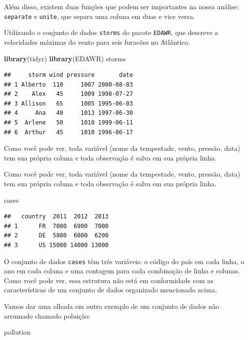 \documentclass[]{book}
\newenvironment{Shaded}{\begin{snugshade}}{\end{snugshade}}
\newcommand{\KeywordTok}[1]{\textcolor[rgb]{0.13,0.29,0.53}{\textbf{#1}}}
\newcommand{\NormalTok}[1]{#1}
\begin{document}
Além disso, existem duas funções que podem ser importantes na nossa análise: \texttt{separate} e \texttt{unite}, que separa uma coluna em duas e vice versa.

Utilizando o conjunto de dados \texttt{storms} do pacote \texttt{EDAWR}, que descreve a velocidades máximas do vento para seis furacões no Atlântico.

\begin{Shaded}
\begin{Highlighting}[]
\KeywordTok{library}\NormalTok{(tidyr)}
\KeywordTok{library}\NormalTok{(EDAWR)}
\NormalTok{storms}
\end{Highlighting}
\end{Shaded}

\begin{verbatim}
##     storm wind pressure       date
## 1 Alberto  110     1007 2000-08-03
## 2    Alex   45     1009 1998-07-27
## 3 Allison   65     1005 1995-06-03
## 4     Ana   40     1013 1997-06-30
## 5  Arlene   50     1010 1999-06-11
## 6  Arthur   45     1010 1996-06-17
\end{verbatim}

Como você pode ver, toda variável (nome da tempestade, vento, pressão, data) tem sua própria coluna e toda observação é salva em sua própria linha.

Como você pode ver, toda variável (nome da tempestade, vento, pressão, data) tem sua própria coluna e toda observação é salva em sua própria linha.

\begin{Shaded}
\begin{Highlighting}[]
\NormalTok{cases}
\end{Highlighting}
\end{Shaded}

\begin{verbatim}
##   country  2011  2012  2013
## 1      FR  7000  6900  7000
## 2      DE  5800  6000  6200
## 3      US 15000 14000 13000
\end{verbatim}

O conjunto de dados \texttt{cases} têm três variáveis: o código do país em cada linha, o ano em cada coluna e uma contagem para cada combinação de linha e colunas. Como você pode ver, essa estrutura não está em conformidade com as características de um conjunto de dados organizado mencionado acima.

Vamos dar uma olhada em outro exemplo de um conjunto de dados não arrumado chamado poluição:

\begin{Shaded}
\begin{Highlighting}[]
\NormalTok{pollution}
\end{Highlighting}
\end{Shaded}
\end{document}
